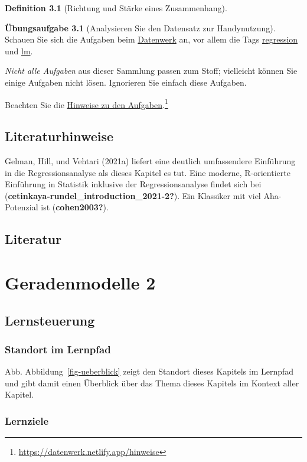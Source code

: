 \documentclass[
  a4paper,
  DIV=11]{scrreprt}
\theoremstyle{definition}
\newtheorem{exercise}{Übungsaufgabe}[chapter]
\theoremstyle{definition}
\theoremstyle{definition}
\newtheorem{definition}{Definition}[chapter]
\theoremstyle{remark}
\begin{document}
\begin{definition}[Richtung und Stärke eines
Zusammenhang]
\begin{exercise}[Analysieren Sie den Datensatz zur
Handynutzung]
Schauen Sie sich die Aufgaben beim
\href{https://datenwerk.netlify.app/}{Datenwerk} an, vor allem die Tags
\href{https://datenwerk.netlify.app/\#category=regression}{regression}
und \href{https://datenwerk.netlify.app/\#category=lm}{lm}.

\emph{Nicht alle Aufgaben} aus dieser Sammlung passen zum Stoff;
vielleicht können Sie einige Aufgaben nicht lösen. Ignorieren Sie
einfach diese Aufgaben.

Beachten Sie die \href{https://datenwerk.netlify.app/hinweise}{Hinweise
zu den Aufgaben}.\footnote{\url{https://datenwerk.netlify.app/hinweise}}

\section{Literaturhinweise}\label{literaturhinweise-7}

Gelman, Hill, und Vehtari (2021a) liefert eine deutlich umfassendere
Einführung in die Regressionsanalyse als dieses Kapitel es tut. Eine
moderne, R-orientierte Einführung in Statistik inklusive der
Regressionsanalyse findet sich bei
(\textbf{cetinkaya-rundel\_introduction\_2021-2?}). Ein Klassiker mit
viel Aha-Potenzial ist (\textbf{cohen2003?}).

\section{Literatur}\label{literatur-7}

\chapter{Geradenmodelle 2}\label{geradenmodelle-2}

\section{Lernsteuerung}\label{lernsteuerung-8}

\subsection{Standort im Lernpfad}\label{standort-im-lernpfad-8}

Abb. Abbildung~\ref{fig-ueberblick} zeigt den Standort dieses Kapitels
im Lernpfad und gibt damit einen Überblick über das Thema dieses
Kapitels im Kontext aller Kapitel.

\subsection{Lernziele}\label{lernziele-9}


\end{exercise}
\end{definition}
\end{document}
